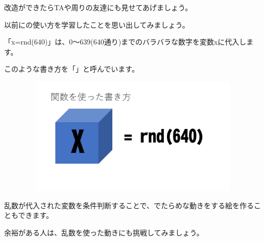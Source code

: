 改造ができたらTAや周りの友達にも見せてあげましょう。


以前にの使い方を学習したことを思い出してみましょう。

「x=rnd(640)」は、0〜639(640通り)までのバラバラな数字を変数xに代入します。

このような書き方を「」と呼んでいます。

\begin{figure}[H]
    \begin{center}
      \includegraphics[keepaspectratio,width=11.906cm,height=5.662cm]{text04-img/text04-img039.png}
    \end{center}
    \label{fig:prog_menu}
\end{figure}

\begin{description}
    \item {}
    \item {}
    \item {}
\end{description}

乱数が代入された変数を条件判断することで、でたらめな動きをする絵を作ることもできます。

余裕がある人は、乱数を使った動きにも挑戦してみましょう。

